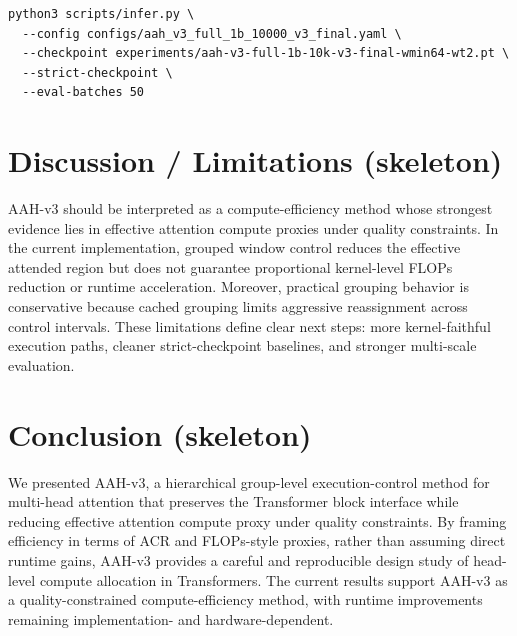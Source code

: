\documentclass[11pt]{article}
\begin{document}
\begin{verbatim}
python3 scripts/infer.py \
  --config configs/aah_v3_full_1b_10000_v3_final.yaml \
  --checkpoint experiments/aah-v3-full-1b-10k-v3-final-wmin64-wt2.pt \
  --strict-checkpoint \
  --eval-batches 50
\end{verbatim}




\section{Discussion / Limitations (skeleton)}

AAH-v3 should be interpreted as a compute-efficiency method whose strongest evidence lies in effective attention compute proxies under quality constraints. In the current implementation, grouped window control reduces the effective attended region but does not guarantee proportional kernel-level FLOPs reduction or runtime acceleration. Moreover, practical grouping behavior is conservative because cached grouping limits aggressive reassignment across control intervals. These limitations define clear next steps: more kernel-faithful execution paths, cleaner strict-checkpoint baselines, and stronger multi-scale evaluation.



\section{Conclusion (skeleton)}

We presented AAH-v3, a hierarchical group-level execution-control method for multi-head attention that preserves the Transformer block interface while reducing effective attention compute proxy under quality constraints. By framing efficiency in terms of ACR and FLOPs-style proxies, rather than assuming direct runtime gains, AAH-v3 provides a careful and reproducible design study of head-level compute allocation in Transformers. The current results support AAH-v3 as a quality-constrained compute-efficiency method, with runtime improvements remaining implementation- and hardware-dependent.
\end{document}
